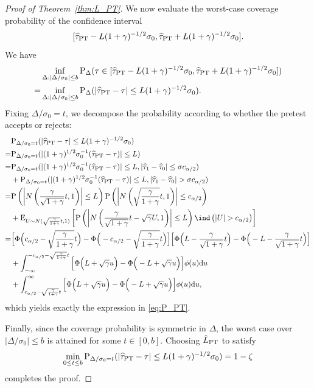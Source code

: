 \documentclass[11pt]{article}
\def\P{{\mathrm P}}
\def\E{{\mathrm E}}
\def\d{{\mathrm d}}
\newcommand{\htau}{\widehat\tau}
\numberwithin{equation}{section}
\theoremstyle{definition}
\begin{document}
\begin{proof}[Proof of Theorem~\ref{thm:L_PT}]
We now evaluate the worst-case coverage probability of the confidence interval
\[
  [\htau_{\rm PT} - L (1+\gamma)^{-1/2} \sigma_0, \htau_{\rm PT} + L (1+\gamma)^{-1/2} \sigma_0].
\]
We have
\begin{align*}
  & \inf_{\Delta: \lvert \Delta/\sigma_0 \rvert \le b} \P_\Delta(\tau \in [\htau_{\rm PT} - L (1+\gamma)^{-1/2} \sigma_0, \htau_{\rm PT} + L (1+\gamma)^{-1/2} \sigma_0])\\
  =& \inf_{\Delta: \lvert \Delta/\sigma_0 \rvert \le b} \P_\Delta(\lvert \htau_{\rm PT} - \tau \rvert \le L (1+\gamma)^{-1/2} \sigma_0).
\end{align*}
Fixing $\Delta/\sigma_0=t$, we decompose the probability according to whether the pretest accepts or rejects:
\begin{align*}
  &\P_{\Delta/\sigma_0 = t}(\lvert \htau_{\rm PT} - \tau \rvert \le L (1+\gamma)^{-1/2} \sigma_0)\\
  =&\P_{\Delta/\sigma_0 = t}(\lvert (1+\gamma)^{1/2} \sigma_0^{-1} (\htau_{\rm PT} - \tau) \rvert \le L)\\
  =&\P_{\Delta/\sigma_0 = t}(\lvert (1+\gamma)^{1/2} \sigma_0^{-1} (\htau_{\rm PT} - \tau) \rvert \le L, \lvert \htau_1 - \htau_0 \rvert \le \sigma c_{\alpha/2}) \\
  &+ \P_{\Delta/\sigma_0 = t}(\lvert (1+\gamma)^{1/2} \sigma_0^{-1} (\htau_{\rm PT} - \tau) \rvert \le L, \lvert \htau_1 - \htau_0 \rvert > \sigma c_{\alpha/2})\\ 
  =& \P\left( \left\lvert N\left(\frac{\gamma}{\sqrt{1+\gamma}} t, 1\right) \right\rvert \le L \right) \P\left( \left\lvert N\left(\sqrt{\frac{\gamma}{1+\gamma}} t, 1\right) \right\rvert \le c_{\alpha/2} \right)\\
  &+ \E_{U \sim N(\sqrt{\frac{\gamma}{1+\gamma}} t, 1)}\left[\P\left( \left\lvert N\left(\frac{\gamma}{\sqrt{1+\gamma}} t - \sqrt{\gamma} U, 1\right) \right\rvert \le L \right) \ind\left(\lvert U \rvert > c_{\alpha/2}\right)\right]\\
  =& \Big[\Phi\Big(c_{\alpha/2} - \sqrt{\frac{\gamma}{1+\gamma}}t \Big) - \Phi\Big(-c_{\alpha/2} - \sqrt{\frac{\gamma}{1+\gamma}}t \Big)\Big]\Big[\Phi\Big(L - \frac{\gamma}{\sqrt{1+\gamma}}t \Big) - \Phi\Big(-L - \frac{\gamma}{\sqrt{1+\gamma}}t \Big)\Big]\\
  &+ \int_{-\infty}^{-c_{\alpha/2} - \sqrt{\frac{\gamma}{1+\gamma}}t} \Big[\Phi\Big(L + \sqrt{\gamma} u \Big) - \Phi\Big(-L + \sqrt{\gamma} u\Big)\Big] \phi(u) \d u\\
  &+ \int_{c_{\alpha/2} - \sqrt{\frac{\gamma}{1+\gamma}}t}^\infty \Big[\Phi\Big(L + \sqrt{\gamma} u\Big) - \Phi\Big(-L + \sqrt{\gamma} u\Big)\Big] \phi(u) \d u,
\end{align*}
which yields exactly the expression in \eqref{eq:P_PT}.

Finally, since the coverage probability is symmetric in $\Delta$, the worst case over
$\lvert \Delta/\sigma_0\rvert\le b$ is attained for some $t\in[0,b]$. Choosing $\hat L_{\rm PT}$ to satisfy
\[
  \min_{0 \le t \le b}\P_{\Delta/\sigma_0 = t}(\lvert \htau_{\rm PT} - \tau \rvert \le L (1+\gamma)^{-1/2} \sigma_0) = 1-\zeta
\]
completes the proof.
  
\end{proof}
\end{document}
